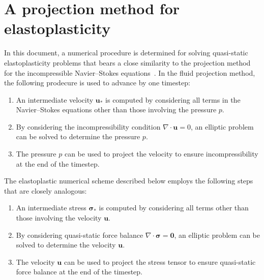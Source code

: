 \documentclass[11pt]{article}
\newcommand{\bsig}{\boldsymbol\sigma}
\renewcommand{\vec}[1]{\mathbf{#1}}
\newcommand{\vus}{\vec{u}_*}
\begin{document}
\section*{A projection method for elastoplasticity}
In this document, a numerical procedure is determined for solving quasi-static
elastoplasticity problems that bears a close similarity to the projection method
for the incompressible Navier--Stokes equations~\cite{chorin68}. In the fluid
projection method, the following prodecure is used to advance by one timestep:
\begin{enumerate}
  \item An intermediate velocity $\vus$ is computed by considering all terms in
    the Navier--Stokes equations other than those involving the pressure $p$.
  \item By considering the incompressibility condition $\nabla \cdot \vec{u}=0$,
    an elliptic problem can be solved to determine the pressure $p$.
  \item The pressure $p$ can be used to project the velocity to ensure
    incompressibility at the end of the timestep.
\end{enumerate}
The elastoplastic numerical scheme described below employs the following steps
that are closely analogous:
\begin{enumerate}
  \item An intermediate stress $\bsig_*$ is computed by considering all terms
    other than those involving the velocity $\vec{u}$.
  \item By considering quasi-static force balance $\nabla \cdot \bsig=\vec{0}$,
    an elliptic problem can be solved to determine the velocity $\vec{u}$.
  \item The velocity $\vec{u}$ can be used to project the stress tensor
    to ensure quasi-static force balance at the end of the timestep.
\end{enumerate}
\end{document}

